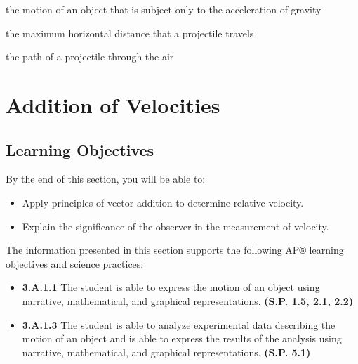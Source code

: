 \documentclass[
]{book}
\providecommand{\tightlist}{%
  \setlength{\itemsep}{0pt}\setlength{\parskip}{0pt}}
\newenvironment{learning-objectives}{}{}
\begin{document}
\begin{description}
\tightlist
\item[projectile motion]
the motion of an object that is subject only to the acceleration of
gravity
\end{description}

\begin{description}
\tightlist
\item[range]
the maximum horizontal distance that a projectile travels
\end{description}

\begin{description}
\tightlist
\item[trajectory]
the path of a projectile through the air
\end{description}

\hypertarget{addition-of-velocities}{%
\section{Addition of Velocities}\label{addition-of-velocities}}

\hypertarget{fs-id1524943}{}
\begin{learning-objectives}

\hypertarget{learning-objectives-11}{%
\subsection{Learning Objectives}\label{learning-objectives-11}}

By the end of this section, you will be able to:

\begin{itemize}
\tightlist
\item
  Apply principles of vector addition to determine relative velocity.
\item
  Explain the significance of the observer in the measurement of
  velocity.
\end{itemize}

The information presented in this section supports the following AP®
learning objectives and science practices:

\begin{itemize}
\tightlist
\item
  \textbf{3.A.1.1} The student is able to express the motion of an object
  using narrative, mathematical, and graphical representations.
  \textbf{(S.P. 1.5, 2.1, 2.2)}
\item
  \textbf{3.A.1.3} The student is able to analyze experimental data
  describing the motion of an object and is able to express the
  results of the analysis using narrative, mathematical, and graphical
  representations. \textbf{(S.P. 5.1)}
\end{itemize}

\end{learning-objectives}
\end{document}
